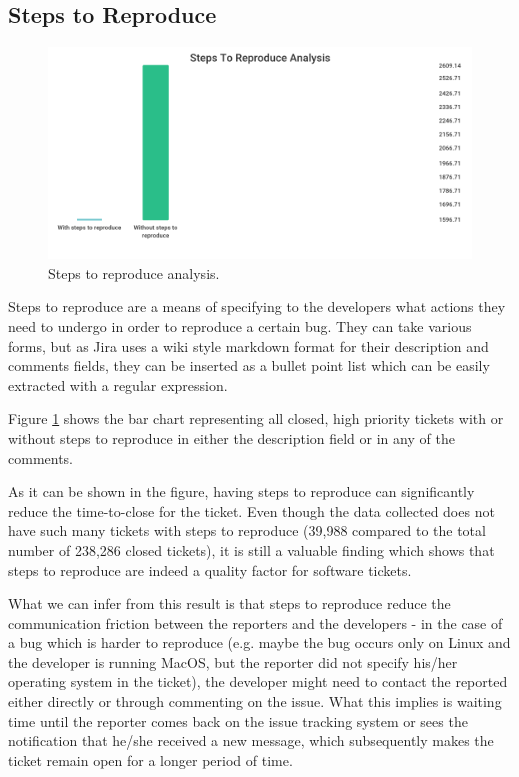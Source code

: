 \documentclass{mpaper}
\begin{document}
\subsection{Steps to Reproduce}

\begin{figure}[ht]
  \begin{center}
    \includegraphics[scale=0.23]{images/steps_to_reproduce.png}
  \end{center}
  \caption{\label{steps}Steps to reproduce analysis.}
\end{figure}

Steps to reproduce are a means of specifying to the developers what actions they need to undergo in order 
to reproduce a certain bug. They can take various forms, but as Jira uses a wiki style markdown format for 
their description and comments fields, they can be inserted as a bullet point list which can be easily 
extracted with a regular expression. 

Figure \ref{steps} shows the bar chart representing all closed, high priority tickets with or without steps 
to reproduce in either the description field or in any of the comments.

As it can be shown in the figure, having steps to reproduce can significantly reduce the time-to-close 
for the ticket. Even though the data collected does not have such many tickets with steps to reproduce 
(39,988 compared to the total number of 238,286 closed tickets), it is still a valuable finding which shows 
that steps to reproduce are indeed a quality factor for software tickets. 

What we can infer from this result is that steps to reproduce reduce the communication friction between 
the reporters and the developers - in the case of a bug which is harder to reproduce (e.g. maybe the 
bug occurs only on Linux and the developer is running MacOS, but the reporter did not specify his/her 
operating system in the ticket), the developer might need to contact the reported either directly or 
through commenting on the issue. What this implies is waiting time until the reporter comes back on the 
issue tracking system or sees the notification that he/she received a new message, which subsequently makes 
the ticket remain open for a longer period of time. 
\end{document}
